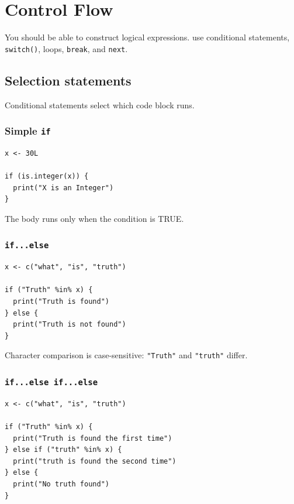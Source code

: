 \chapter{Control Flow}
\label{chap:control-flow}

\chapterguide
  {You should be able to construct logical expressions.}
  {use conditional statements, \texttt{switch()}, loops, \texttt{break}, and \texttt{next}.}

\section{Selection statements}

Conditional statements select which code block runs.

\subsection{Simple \texttt{if}}

\begin{lstlisting}[style=dsr]
x <- 30L

if (is.integer(x)) {
  print("X is an Integer")
}
\end{lstlisting}

The body runs only when the condition is TRUE.

\subsection{\texttt{if...else}}

\begin{lstlisting}[style=dsr]
x <- c("what", "is", "truth")

if ("Truth" %in% x) {
  print("Truth is found")
} else {
  print("Truth is not found")
}
\end{lstlisting}

Character comparison is case-sensitive: \texttt{"Truth"} and \texttt{"truth"} differ.

\subsection{\texttt{if...else if...else}}

\begin{lstlisting}[style=dsr]
x <- c("what", "is", "truth")

if ("Truth" %in% x) {
  print("Truth is found the first time")
} else if ("truth" %in% x) {
  print("truth is found the second time")
} else {
  print("No truth found")
}
\end{lstlisting}

